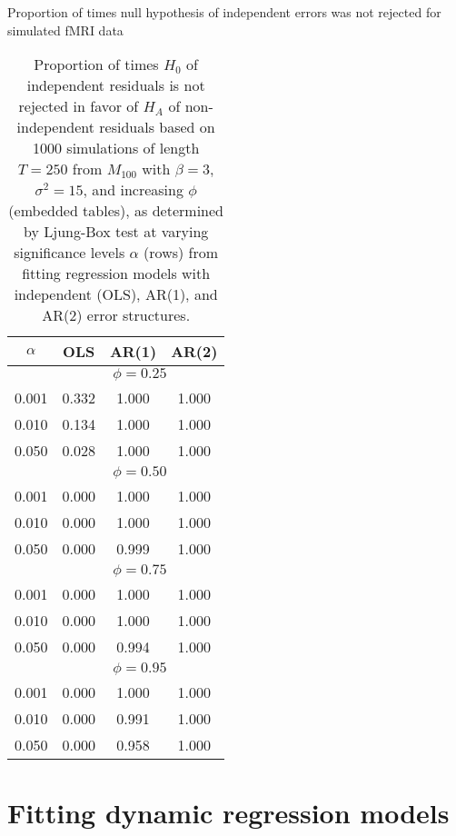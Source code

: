 \begin{table}
\ssp
\centering
\caption{Proportion of times null hypothesis of independent errors was not rejected for simulated fMRI data} \label{tab:fmri:res}
\begin{tabular}{|c|ccc|}
\hline
$\alpha$ & OLS & AR(1) & AR(2) \\
\hline
 & \multicolumn{3}{|c|}{$\phi = 0.25$} \\
\hline
0.001 & 0.332 & 1.000 & 1.000 \\
0.010 & 0.134 & 1.000 & 1.000 \\
0.050 & 0.028 & 1.000 & 1.000 \\
\hline
 & \multicolumn{3}{|c|}{$\phi = 0.50$} \\
\hline
0.001 & 0.000 & 1.000 & 1.000 \\
0.010 & 0.000 & 1.000 & 1.000 \\
0.050 & 0.000 & 0.999 & 1.000 \\
\hline
 & \multicolumn{3}{|c|}{$\phi = 0.75$} \\
\hline
0.001 & 0.000 & 1.000 & 1.000 \\
0.010 & 0.000 & 1.000 & 1.000 \\
0.050 & 0.000 & 0.994 & 1.000 \\
\hline
 & \multicolumn{3}{|c|}{$\phi = 0.95$} \\
\hline
0.001 & 0.000 & 1.000 & 1.000 \\
0.010 & 0.000 & 0.991 & 1.000 \\
0.050 & 0.000 & 0.958 & 1.000 \\
\hline
\end{tabular}
\caption*{Proportion of times $H_0$ of independent residuals is not rejected in favor of $H_A$ of non-independent residuals based on 1000 simulations of length $T = 250$ from $M_{100}$ with $\beta = 3$, $\sigma^2 = 15$, and increasing $\phi$ (embedded tables), as determined by Ljung-Box test at varying significance levels $\alpha$ (rows) from fitting regression models with independent (OLS), AR(1), and AR(2) error structures.}
\end{table}

\section{Fitting dynamic regression models \label{sec:fmri:dr}}

